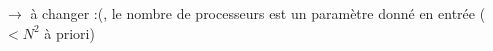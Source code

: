 \documentclass[a4paper,10pt]{article} %
\theoremstyle{definition} %
\begin{document}
$\longrightarrow$ à changer :(, le nombre de processeurs est un paramètre donné en entrée ($< N^2$ à priori)




\end{document}
